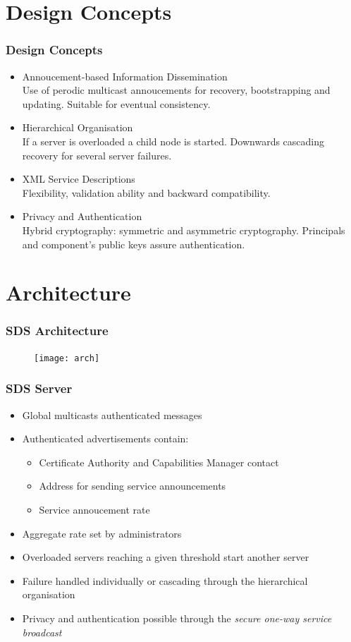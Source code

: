 \documentclass{beamer}
\begin{document}
\section{Design Concepts} 

\begin{frame}
\frametitle{Design Concepts}
\begin{itemize}
\item \alert<+>{Annoucement-based Information Dissemination} \hfill \\
Use of perodic multicast annoucements for recovery, bootstrapping and updating. Suitable for eventual consistency.
\item \alert<+>{Hierarchical Organisation} \hfill \\
If a server is overloaded a child node is started. Downwards cascading recovery for several server failures.
\item \alert<+>{XML Service Descriptions} \hfill \\
Flexibility, validation ability and backward compatibility.
\item \alert<+>{Privacy and Authentication} \hfill \\
Hybrid cryptography: symmetric and asymmetric cryptography. Principals and component's public keys assure authentication.
\end{itemize}
\end{frame}

\section{Architecture}
\begin{frame}
\frametitle{SDS Architecture}
\begin{figure}
\centering
\texttt{[image: arch]}
\end{figure}
\end{frame}

\begin{frame}
\frametitle{SDS Server}
\begin{itemize}
\item Global multicasts authenticated messages
\item Authenticated advertisements contain:
\begin{itemize}
\item Certificate Authority and Capabilities Manager contact
\item Address for sending service announcements
\item Service annoucement rate
\end{itemize}
\item Aggregate rate set by administrators
\item Overloaded servers reaching a given threshold start another server
\item Failure handled individually or cascading through the hierarchical organisation
\item Privacy and authentication possible through the {\it secure one-way service broadcast}
\end{itemize}
\end{frame}
\end{document}
